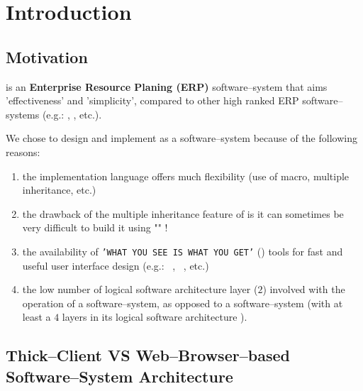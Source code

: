 \chapter{Introduction}

\section{Motivation}

\yerotherpblack is an \textbf{Enterprise Resource Planing (ERP)}
software--system that aims 'effectiveness' and 'simplicity',
compared to other high ranked ERP software--systems
(e.g.: \sageerp, \saperp, etc.).

We chose to design and implement \yerotherpblack as
a \thickclient software--system because of the
following reasons:

\begin{enumerate}[1.]

	\item the implementation language \cplusplus
		offers much flexibility (use of macro, 
		multiple inheritance, etc.)
	
	\item the drawback of the multiple inheritance
		feature of \cplusplus is it can sometimes
		be very difficult to build it using "\gplusplus" !
		
	\item the availability of \texttt{'WHAT YOU SEE IS WHAT YOU GET'}
		(\wy) tools for fast and useful
		user interface design (e.g.: \qtdesigner~\cite{qtdesigner:2020},
		\ministudio~\cite{miniStudio:2020}, etc.)
		
	\item the low number of logical software architecture
		layer ($2$) involved with the operation
		of a \thickclient software--system,	as opposed
		to a \webbrowserbased software--system
		(with at least a $4$ layers in its 
		logical software architecture ).
	
\end{enumerate}


\section{Thick--Client VS Web--Browser--based
	Software--System Architecture}



